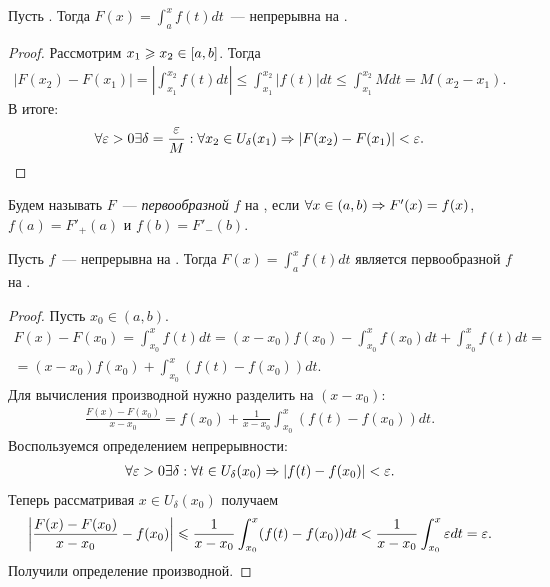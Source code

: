 \documentclass[../main.tex]{subfiles}
\begin{document}
\begin{proposition}
    Пусть \fintonab. Тогда $F(x) = \int_a^x f(t) dt$~--- непрерывна на \segab.
\end{proposition}

\begin{proof}
    Рассмотрим $x_1 \geqslant x_2 \in [a,b]$. Тогда
    \begin{gather*}
        |F(x_2) - F(x_1)| = \left|\int_{x_1}^{x_2}f(t)dt\right| \leq \int_{x_1}^{x_2}|f(t)|dt \leq \int_{x_1}^{x_2} M dt = M(x_2 - x_1).
    \end{gather*}
    В итоге:
    \begin{gather*}
        \forall \varepsilon > 0 \exists \delta = \frac{\varepsilon}{M}: \forall x_2 \in U_\delta(x_1) \Rightarrow |F(x_2) - F(x_1)| < \varepsilon.
    \end{gather*}
\end{proof}

\begin{definition}
    Будем называть $F$~--- \emph{первообразной} $f$ на \segab, если $\forall x \in (a, b) \Rightarrow F'(x) = f(x)$, $f(a) = F'_+(a)$ и $f(b) = F'_-(b)$.
\end{definition}

\begin{proposition}
    Пусть $f$~--- непрерывна на \segab. Тогда $F(x) = \int_a^xf(t)dt$ является первообразной $f$ на \segab.
\end{proposition}

\begin{proof}
    Пусть $x_0 \in (a,b)$. 
    \begin{multline*}
    F(x) - F(x_0) = \int_{x_0}^x f(t) dt = (x-x_0)f(x_0) - \int_{x_0}^x f(x_0) dt + \int_{x_0}^x f(t) dt = \\ = (x-x_0)f(x_0) + \int_{x_0}^x (f(t)-f(x_0)) dt.
    \end{multline*}
    Для вычисления производной нужно разделить на $(x-x_0)$:
    \begin{gather*}
        \frac{F(x) - F(x_0)}{x-x_0} = f(x_0) + \frac{1}{x-x_0} \int_{x_0}^x (f(t)-f(x_0)) dt.
    \end{gather*}
    Воспользуемся определением непрерывности:
    \begin{gather*}
        \forall\varepsilon>0 \exists\delta:\forall t\in U_\delta(x_0) \Rightarrow |f(t) - f(x_0)| < \varepsilon.
    \end{gather*} 
    Теперь рассматривая $x \in U_\delta(x_0)$ получаем   
    \begin{gather*}
        \left|\frac{F(x) - F(x_0)}{x-x_0} - f(x_0)\right| \leqslant \frac{1}{x-x_0} \int_{x_0}^x (f(t)-f(x_0)) dt < \frac{1}{x-x_0} \int_{x_0}^x \varepsilon dt = \varepsilon.
    \end{gather*}
    Получили определение производной.
\end{proof}
\end{document}
